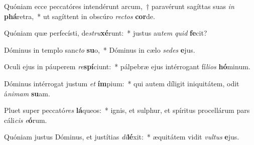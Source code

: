 \item Quóniam ecce peccatóres intendérunt arcum,~† paravérunt sagíttas suas \textit{in} \textbf{phá}retra,~* ut sagíttent in obscúro \textit{rec}\textit{tos} \textbf{cor}de.
\item Quóniam quæ perfecísti, de\textit{stru}\textbf{xé}runt:~* justus au\textit{tem} \textit{quid} \textbf{fe}cit?
\item Dóminus in templo sanc\textit{to} \textbf{su}o,~* Dóminus in cælo \textit{se}\textit{des} \textbf{e}jus.
\item Oculi ejus in páuperem \textit{re}\textbf{spí}ciunt:~* pálpebræ ejus intérrogant fí\textit{li}\textit{os} \textbf{hó}minum.
\item Dóminus intérrogat justum \textit{et} \textbf{ím}pium:~* qui autem díligit iniquitátem, odit á\textit{ni}\textit{mam} \textbf{su}am.
\item Pluet super peccató\textit{res} \textbf{lá}queos:~* ignis, et sulphur, et spíritus procellárum pars cáli\textit{cis} \textit{e}\textbf{ó}rum.
\item Quóniam justus Dóminus, et justítias \textit{di}\textbf{lé}xit:~* æquitátem vidit \textit{vul}\textit{tus} \textbf{e}jus.

